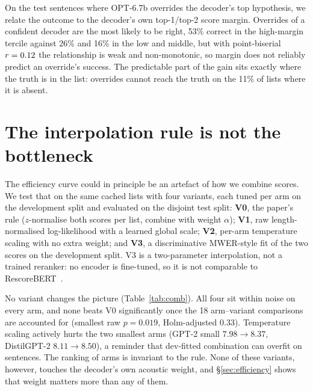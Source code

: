 \documentclass[11pt]{article}
\begin{document}
On the \nOverride{} test sentences where OPT-6.7b overrides the decoder's top
hypothesis, we relate the outcome to the decoder's own top-1/top-2 score margin.
Overrides of a confident decoder are the most likely to be right, 53\% correct in the
high-margin tercile against 26\% and 16\% in the low and middle, but with
point-biserial $r=0.12$ the relationship is weak and non-monotonic, so margin does
not reliably predict an override's success. The predictable part of the gain sits exactly
where the truth is in the list: overrides cannot reach the truth on the 11\% of lists
where it is absent.

\section{The interpolation rule is not the bottleneck}
\label{sec:comb}

\begin{table}[t]
\centering\small

\caption{Test WER for four score-combination schemes on identical lists, each tuned per
arm on the development split. No variant beats V0 once the 18 arm--variant comparisons
are accounted for (paired bootstrap, one-sided; best raw $p=0.019$ for DistilGPT-2 under
V3, Holm-adjusted $p=0.33$). V3 is a linear MWER-style fit of the two
scores, not a trained reranker.}
\label{tab:comb}
\end{table}

The efficiency curve could in principle be an artefact of how we combine scores. We test
that on the same cached lists with four variants, each tuned per arm on the development
split and evaluated on the disjoint test split: \textbf{V0}, the paper's rule ($z$-normalise
both scores per list, combine with weight $\alpha$); \textbf{V1}, raw length-normalised
log-likelihood with a learned global scale; \textbf{V2}, per-arm temperature scaling with
no extra weight; and \textbf{V3}, a discriminative MWER-style fit of the two scores on the
development split. V3 is a two-parameter interpolation, not a trained reranker: no encoder
is fine-tuned, so it is not comparable to RescoreBERT~\cite{rescorebert}.

No variant changes the picture (Table~\ref{tab:comb}). All four sit within noise on every
arm, and none beats V0 significantly once the 18 arm--variant comparisons are accounted
for (smallest raw $p=0.019$, Holm-adjusted $0.33$). Temperature scaling actively hurts the
two smallest arms (GPT-2 small $7.98 \rightarrow 8.37$, DistilGPT-2 $8.11 \rightarrow
8.50$), a reminder that dev-fitted combination can overfit on \nDev{} sentences. The
ranking of arms is invariant to the rule. None of these variants, however, touches the
decoder's own acoustic weight, and \S\ref{sec:efficiency} shows that weight matters more
than any of them.
\end{document}
